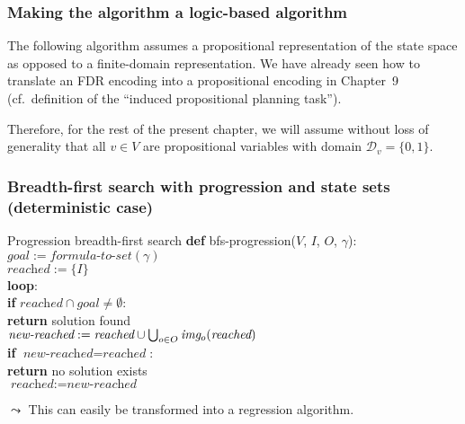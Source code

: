 \documentclass{gkibeamer}
\begin{document}
\begin{frame}
  \frametitle{Making the algorithm a logic-based algorithm}

   The following algorithm assumes a propositional
  representation of the state space as opposed to a finite-domain
  representation. We have already seen how to translate an FDR
  encoding into a propositional encoding in Chapter~9 (cf.\ definition
  of the ``induced propositional planning task'').

  \smallskip

  Therefore, for the rest of the present chapter, we will assume
  without loss of generality that all $v \in V$ are propositional
  variables with domain $\mathcal D_v = \{ 0, 1 \}$.
\end{frame}

\begin{frame}[t]
  \frametitle{Breadth-first search with progression and
    state sets (deterministic case)}

  \begin{block}{Progression breadth-first search}
    \textbf{def} bfs-progression($V$, $I$, $O$, $\gamma$): \\
    {}\qquad$\textit{goal} := \textit{formula-to-set}(\gamma)$ \\
    {}\qquad$\textit{reached} := \{I\}$ \\
    {}\qquad\textbf{loop}: \\
    {}\qquad\qquad\textbf{if} $\textit{reached} \cap \textit{goal}
    \neq \emptyset$: \\
    {}\qquad\qquad\qquad\textbf{return} solution found \\
    {}\qquad\qquad$\textit{new-reached} := \textit{reached} \cup
    \bigcup_{o \in O} \image{o}{\textit{reached}}$ \\
    {}\qquad\qquad\textbf{if} $\textit{new-reached} = 
    \textit{reached}$: \\
    {}\qquad\qquad\qquad\textbf{return} no solution exists \\
    {}\qquad\qquad$\textit{reached} := \textit{new-reached}$
  \end{block}
  
  $\leadsto$ This can easily be transformed into a \alert{regression}
  algorithm.
\end{frame}
\end{document}
